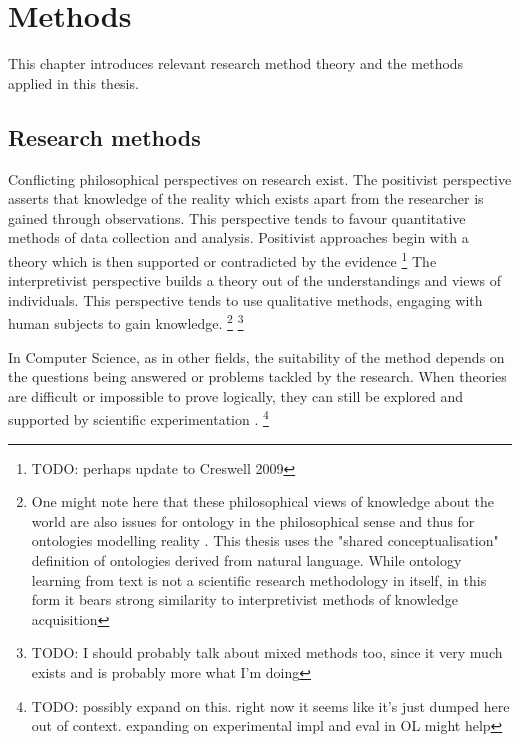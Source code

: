 \documentclass[a4paper]{report}
\newcommand{\todo}[1]{\footnote{{\color{red} TODO: #1}}}
\begin{document}
\chapter{Methods}

This chapter introduces relevant research method theory and the methods applied in this thesis.

\section{Research methods}
\label{sec:methods:research}
Conflicting philosophical perspectives on research exist.
The positivist perspective asserts that knowledge of the reality which exists apart from the researcher is gained through observations.
This perspective tends to favour quantitative methods of data collection and analysis.
Positivist approaches begin with a theory which is then supported or contradicted by the evidence \cite[p.6-7]{creswell2003research}\todo{perhaps update to Creswell 2009}
The interpretivist perspective builds a theory out of the understandings and views of individuals.
This perspective tends to use qualitative methods, engaging with human subjects to gain knowledge.
\cite[p.7-9]{creswell2003research}
\footnote{One might note here that these philosophical views of knowledge about the world are also issues for ontology in the philosophical sense and thus for ontologies modelling reality \cite[p.6]{creswell2003research}\cite{sep-hermeneutics}.
This thesis uses the "shared conceptualisation" definition of ontologies derived from natural language.
While ontology learning from text is not a scientific research methodology in itself, in this form it bears strong similarity to interpretivist methods of knowledge acquisition}
\todo{I should probably talk about mixed methods too, since it very much exists and is probably more what I'm doing}

In Computer Science, as in other fields, the suitability  of the method depends on the questions being answered or problems tackled by the research.
When theories are difficult or impossible to prove logically, they can still be explored and supported by scientific experimentation \cite{Blomqvist09Thesis,Crnkovic2002SciMethCS}.
\todo{possibly expand on this. right now it seems like it's just dumped here out of context. expanding on experimental impl and eval in OL might help}
\end{document}
